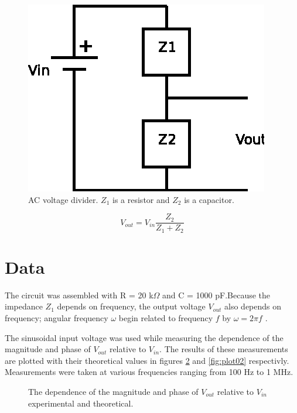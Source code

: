 \documentclass[11pt,onecolumn]{article}
\begin{document}
\begin{figure}
\begin{center}
\includegraphics{Diagram1.eps}
\end{center}
\caption{AC voltage divider. $Z_1$ is a resistor and $Z_2$ is a capacitor.}\label{fig:AC Voltage Divider}
\end{figure}

\begin{equation}\label{eq:AC Voltage Divider}
V_{out} = V_{in} \frac{Z_2}{Z_1 + Z_2}
\end{equation}

\section{Data}\label{sec:Data}
The circuit was assembled with R = 20 k$\Omega$ and C = 1000 pF.Because the impedance $Z_1$ depends on frequency, the output voltage $V_{out}$ also depends on frequency; angular frequency $\omega$ begin related to frequency $f$ by $\omega = 2 \pi f$ \cite{DoPb}.

The sinusoidal input voltage was used while measuring the dependence of the magnitude and phase of $V_{out}$ relative to $V_{in}$. The results of these measurements are plotted with their theoretical values in figures \ref{fig:plot01} and \ref{fig:plot02} respectivly. Measurements were taken at various frequencies ranging from 100 Hz to 1 MHz.
\begin{figure}

\caption{The dependence of the magnitude and phase of $V_{out}$ relative to $V_{in}$ experimental and theoretical.}\label{fig:plot01}
\end{figure}
\end{document}
